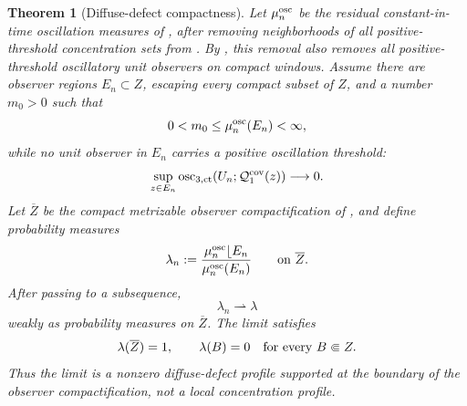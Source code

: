 \documentclass[11pt]{amsart}
\numberwithin{equation}{section}
\theoremstyle{plain}
\newtheorem{theorem}{Theorem}[section]
\theoremstyle{definition}
\theoremstyle{remark}
\newcommand{\actthree}{\operatorname{osc}_{3,\mathrm{ct}}}
\begin{document}
\begin{theorem}[Diffuse-defect compactness]
\label{thm:diffuse-defect-compactness}
Let \(\mu_n^{\rm osc}\) be the residual constant-in-time oscillation measures
of , after removing neighborhoods of all
positive-threshold concentration sets from .  By
, this removal also removes all
positive-threshold oscillatory unit observers on compact windows.
Assume there are observer regions \(E_n\subset Z\), escaping every compact
subset of \(Z\), and a number \(m_0>0\) such that
\[
   0<m_0\le \mu_n^{\rm osc}(E_n)<\infty ,
\]
while no unit observer in \(E_n\) carries a positive oscillation threshold:
\[
   \sup_{z\in E_n}
      \actthree(U_n;\mathcal Q_1^{\rm cov}(z))
   \longrightarrow0 .
\]
Let \(\overline Z\) be the compact metrizable observer compactification of
, and define probability
measures
\[
   \lambda_n
   :=
   \frac{\mu_n^{\rm osc}\lfloor E_n}{\mu_n^{\rm osc}(E_n)}
   \qquad\hbox{on }\overline Z .
\]
After passing to a subsequence,
\[
   \lambda_n\rightharpoonup\lambda
\]
weakly as probability measures on \(\overline Z\).  The limit satisfies
\[
   \lambda(\overline Z)=1,\qquad
   \lambda(B)=0\quad\hbox{for every }B\Subset Z .
\]
Thus the limit is a nonzero diffuse-defect profile supported at the boundary of
the observer compactification, not a local concentration profile.
\end{theorem}
\end{document}
